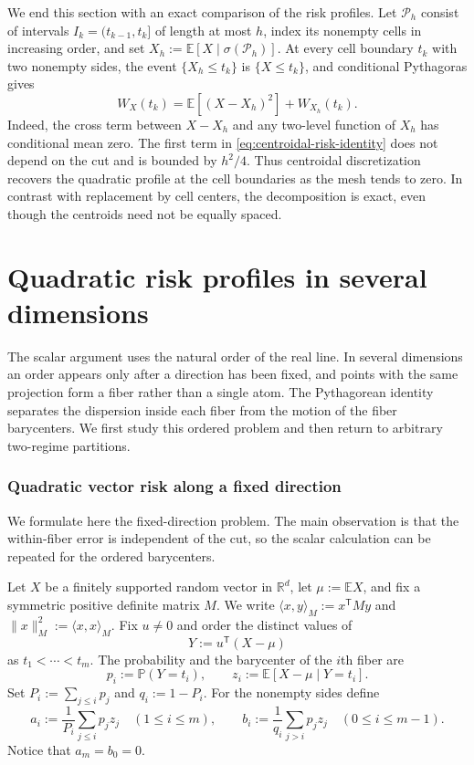 \documentclass[a4paper]{amsart}
\numberwithin{equation}{section}
\theoremstyle{remark}
\newcommand{\E}{\mathbb E}
\newcommand{\1}{\mathbf 1}
\begin{document}
We end this section with an exact comparison of the risk profiles.  Let
$\mathcal P_h$ consist of
intervals $I_k=(t_{k-1},t_k]$ of length at most $h$, index its nonempty cells
in increasing order, and set $X_h:=\E[X\mid\sigma(\mathcal P_h)]$.  At every
cell boundary $t_k$ with two nonempty sides, the event $\{X_h\leq t_k\}$ is
$\{X\leq t_k\}$, and conditional Pythagoras gives
\begin{equation}\label{eq:centroidal-risk-identity}
 W_X(t_k)=\E[(X-X_h)^2]+W_{X_h}(t_k).
\end{equation}
Indeed, the cross term between $X-X_h$ and any two-level function of $X_h$ has
conditional mean zero.  The first term in
\eqref{eq:centroidal-risk-identity} does not depend on the cut and is bounded
by $h^2/4$.  Thus centroidal discretization recovers the quadratic profile at
the cell boundaries as the mesh tends to zero.  In contrast with replacement
by cell centers, the decomposition is exact, even though the centroids need
not be equally spaced.

\part{Quadratic risk profiles in several dimensions}

The scalar argument uses the natural order of the real line.  In several
dimensions an order appears only after a direction has been fixed, and points
with the same projection form a fiber rather than a single atom.  The
Pythagorean identity separates the dispersion inside each fiber from the
motion of the fiber barycenters.  We first study this ordered problem and then
return to arbitrary two-regime partitions.

\section{Quadratic vector risk along a fixed direction}
\label{sec:vector-fixed-direction}

We formulate here the fixed-direction problem.  The main observation is that
the within-fiber error is independent of the cut, so the scalar calculation
can be repeated for the ordered barycenters.

Let $X$ be a finitely supported random vector in $\mathbb R^d$, let
$\mu:=\mathbb E X$, and fix a symmetric positive definite matrix $M$.
We write $\langle x,y\rangle_M:=x^{\mathsf T}My$ and
$\|x\|_M^2:=\langle x,x\rangle_M$.  Fix $u\neq0$ and order the distinct
values of
\[
  Y:=u^{\mathsf T}(X-\mu)
\]
as $t_1<\cdots<t_m$.  The probability and the barycenter of the $i$th
fiber are
\[
  p_i:=\mathbb P(Y=t_i),
  \qquad
  z_i:=\mathbb E[X-\mu\mid Y=t_i].
\]
Set $P_i:=\sum_{j\leq i}p_j$ and $q_i:=1-P_i$.  For the nonempty sides
define
\[
  a_i:=\frac1{P_i}\sum_{j\leq i}p_jz_j\quad(1\leq i\leq m),
  \qquad
  b_i:=\frac1{q_i}\sum_{j>i}p_jz_j\quad(0\leq i\leq m-1).
\]
Notice that $a_m=b_0=0$.
\end{document}
